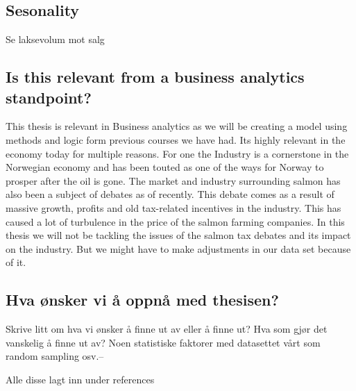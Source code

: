\subsection{Sesonality}
Se laksevolum mot salg

\subsection{Is this relevant from a business analytics standpoint?}
This thesis is relevant in Business analytics as we will be creating a model using methods and logic form previous courses we have had. Its highly relevant in the economy today for multiple reasons. For one the Industry is a cornerstone in the Norwegian economy and has been touted as one of the ways for Norway to prosper after the oil is gone. The market and industry surrounding salmon has also been a subject of debates as of recently. This debate comes as a result of massive growth, profits and old tax-related incentives in the industry. This has caused a lot of turbulence in the price of the salmon farming companies. In this thesis we will not be tackling the issues of the salmon tax debates and its impact on the industry. But we might have to make adjustments in our data set because of it.

\subsection{Hva ønsker vi å oppnå med thesisen?}
Skrive litt om hva vi ønsker å finne ut av eller å finne ut?
Hva som gjør det vanskelig å finne ut av?
Noen statistiske faktorer med datasettet vårt som random sampling osv.--

Alle disse lagt inn under references